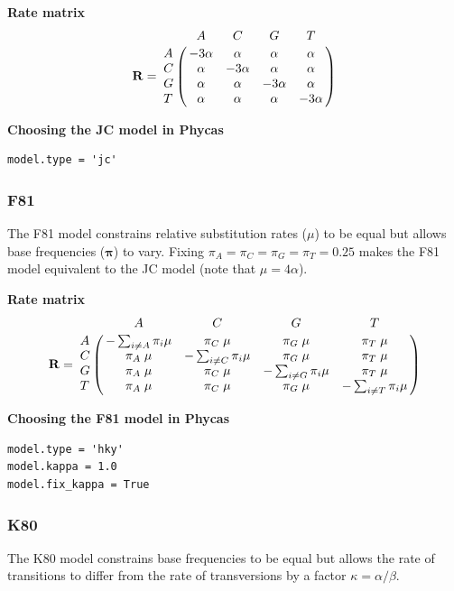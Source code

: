 \documentclass[10pt]{article}
\newcommand{\Rii}[1]{-\sum_{i \neq #1} \pi_i \mu}
\begin{document}
\begin{samepage}
{\bf Rate matrix}
$${\bf R} = \bordermatrix{ &     A     &     C     &     G     &   T       \cr
                         A & -3 \alpha &  \alpha   &  \alpha   &  \alpha   \cr
                         C &  \alpha   & -3 \alpha &  \alpha   &  \alpha   \cr
                         G &  \alpha   &  \alpha   & -3 \alpha &  \alpha   \cr
                         T &  \alpha   &  \alpha   &  \alpha   & -3 \alpha \cr}$$
\end{samepage}

\begin{samepage}
{\bf Choosing the JC model in Phycas}
\begin{verbatim}
model.type = 'jc'
\end{verbatim}
\end{samepage}

\subsubsection{F81}

The F81 model \citep{Felsenstein1981} constrains relative substitution rates ($\mu$) to be equal but allows base frequencies ($\bm \pi$) to vary. Fixing $\pi_A = \pi_C = \pi_G = \pi_T = 0.25$ makes the F81 model equivalent to the JC model (note that $\mu = 4 \alpha$).

\begin{samepage}
{\bf Rate matrix}
$${\bf R} = \bordermatrix{ &       A      &       C       &       G       &       T       \cr
                         A &    \Rii{A}   & \pi_C \; \mu  & \pi_G \; \mu  & \pi_T \; \mu  \cr
                         C & \pi_A \; \mu &    \Rii{C}    & \pi_G \; \mu  & \pi_T \; \mu  \cr
                         G & \pi_A \; \mu & \pi_C \; \mu  &    \Rii{G}    & \pi_T \; \mu  \cr
                         T & \pi_A \; \mu & \pi_C \; \mu  & \pi_G \; \mu  &     \Rii{T}   \cr}$$                                                         
\end{samepage}

\begin{samepage}
{\bf Choosing the F81 model in Phycas}
\begin{verbatim}
model.type = 'hky'
model.kappa = 1.0
model.fix_kappa = True
\end{verbatim}
\end{samepage}

\subsubsection{K80}
The K80 model \citep{Kimura1980} constrains base frequencies to be equal but allows the rate of transitions to differ from the rate of transversions by a factor $\kappa = \alpha/\beta$.
\end{document}
